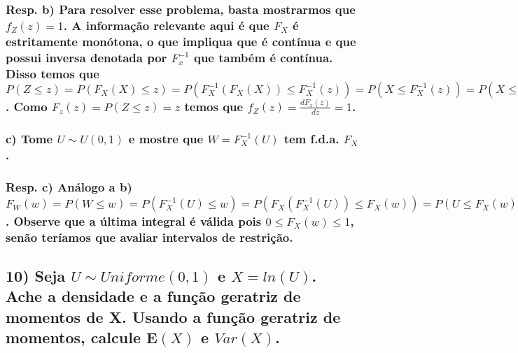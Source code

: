 \documentclass[english]{article}
\begin{document}
\subsubsection*{\textmd{Resp. b) Para resolver esse problema, basta mostrarmos que
$f_{Z}(z)=1$. A informação relevante aqui é que $F_{X}$ é estritamente
monótona, o que impliqua que é contínua e que possui inversa denotada
por $F_{x}^{-1}$ que também é contínua. Disso temos que $P(Z\leq z)=P(F_{X}(X)\leq z)=P(F_{X}^{-1}(F_{X}(X))\leq F_{X}^{-1}(z))=P(X\leq F_{X}^{-1}(z))=P(X\leq F_{X}^{-1}(z))=F_{X}(F_{X}^{-1}(z))=z$.
Como $F_{z}(z)=P(Z\leq z)=z$ temos que $f_{Z}(z)=\frac{dF_{z}(z)}{dz}=1$.}}


\subsubsection*{\textmd{c) Tome $U\sim U(0,1)$ e mostre que $W=F_{X}^{-1}(U)$ tem
f.d.a. $F_{X}$.}}


\subsubsection*{\textmd{Resp. c) Análogo a b)$F_{W}(w)=P(W\leq w)=P(F_{X}^{-1}(U)\leq w)=P(F_{X}(F_{X}^{-1}(U))\leq F_{X}(w))=P(U\leq F_{X}(w))=\int_{0}^{F_{X}(w)}1du=F_{x}(w)$.
Observe que a última integral é válida pois $0\leq F_{X}(w)\leq1$,
senão teríamos que avaliar intervalos de restrição.}}


\subsection*{\textcompwordmark{}}


\subsection*{\textmd{10) Seja $U\sim Uniforme(0,1)$ e $X=ln(U)$. Ache a densidade
e a função geratriz de momentos de X. Usando a função geratriz de
momentos, calcule $\mathbf{E}(X)$ e $Var(X)$.}}
\end{document}
